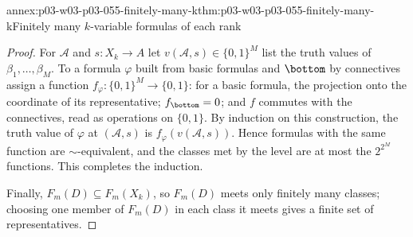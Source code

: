 \begin{annexitem}{annex:p03-w03-p03-055-finitely-many-k}{thm:p03-w03-p03-055-finitely-many-k}{Finitely many \(k\)-variable formulas of each rank}
\begin{proof}
For \(\mathcal A\) and \(s\colon X_k\to A\) let
\(v(\mathcal A,s)\in\{0,1\}^M\) list the truth values of
\(\beta_1,\ldots,\beta_M\). To a formula \(\varphi\) built from basic
formulas and \(\bottom\) by connectives assign a function
\(f_\varphi\colon\{0,1\}^M\to\{0,1\}\): for a basic formula, the projection
onto the coordinate of its representative; \(f_\bottom=0\); and \(f\)
commutes with the connectives, read as operations on \(\{0,1\}\). By
induction on this construction, the truth value of \(\varphi\) at
\((\mathcal A,s)\) is \(f_\varphi(v(\mathcal A,s))\). Hence formulas with the
same function are \(\sim\)-equivalent, and the classes met by the level are
at most the \(2^{2^M}\) functions. This completes the induction.

Finally, \(F_m(D)\subseteq F_m(X_k)\), so \(F_m(D)\) meets only finitely
many classes; choosing one member of \(F_m(D)\) in each class it meets gives
a finite set of representatives.
\end{proof}
\end{annexitem}

